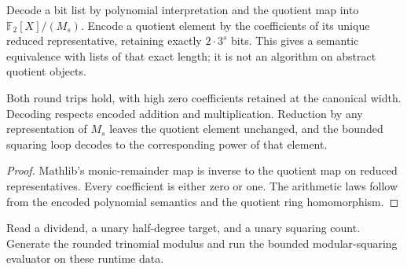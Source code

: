 \begin{definition}
  \label{def:lowerbounds-algebraic-binary-codec}
  \leanok
  Decode a bit list by polynomial interpretation and the quotient map
  into $\mathbb F_2[X]/(M_s)$. Encode a quotient element by the
  coefficients of its unique reduced representative, retaining
  exactly $2\cdot3^s$ bits. This gives a semantic equivalence with
  lists of that exact length; it is not an algorithm on abstract
  quotient objects.
\end{definition}

\begin{theorem}
  \label{thm:lowerbounds-algebraic-binary-codec}
  \leanok
  Both round trips hold, with high zero coefficients retained at
  the canonical width. Decoding respects encoded addition and
  multiplication. Reduction by any representation of $M_s$ leaves
  the quotient element unchanged, and the bounded squaring loop
  decodes to the corresponding power of that element.
\end{theorem}
\begin{proof}
  \leanok
  Mathlib's monic-remainder map is inverse to the quotient map on
  reduced representatives. Every coefficient is either zero or one.
  The arithmetic laws follow from the encoded polynomial semantics
  and the quotient ring homomorphism.
\end{proof}

\begin{definition}
  \label{def:lowerbounds-algebraic-generated-frobenius}
  \leanok
  Read a dividend, a unary half-degree target, and a unary squaring
  count. Generate the rounded trinomial modulus and run the bounded
  modular-squaring evaluator on these runtime data.
\end{definition}

